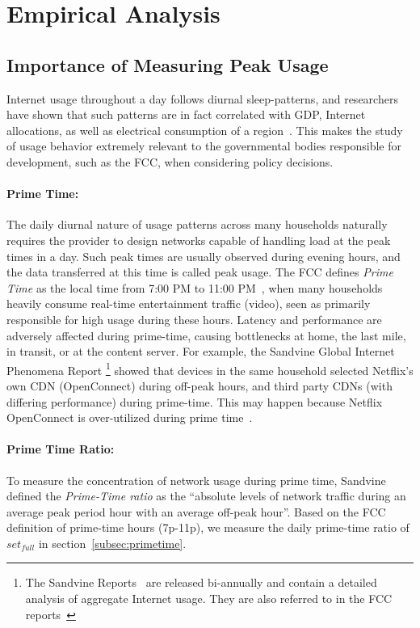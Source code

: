 \section{Empirical Analysis}\label{sec:analysis}

\subsection{Importance of Measuring Peak Usage}

Internet usage throughout a day follows diurnal sleep-patterns, and researchers
have shown that such patterns are in fact correlated with GDP, Internet allocations,
as well as electrical consumption of a region~\cite{ant-diurnal-web}. This makes
the study of usage behavior extremely relevant to the governmental bodies responsible
for development, such as the FCC, when considering policy decisions. 

\paragraph{Prime Time: }The daily diurnal nature of usage patterns across many
households naturally requires the provider to design networks capable of handling 
load at the peak times in a day. Such peak times are usually observed during
evening hours, and the data transferred at this time is called peak usage.
The FCC defines \emph{Prime Time} as the local time from 7:00 PM to 11:00
PM~\cite{fcc2014measuring-broadband}, when many
households heavily consume real-time entertainment traffic (video), seen as primarily
responsible for high usage during these hours. Latency and performance are adversely
affected during prime-time, causing bottlenecks at home, the last mile, in
transit, or at the content server. For example, the Sandvine Global
Internet Phenomena Report \footnote{The Sandvine Reports ~\cite{sandvine20141h,
sandvine20142h}are released bi-annually and
contain a detailed analysis of aggregate Internet usage. They are also referred
to in the FCC reports~\cite{fcc2015progress-report, fcc2014measuring-broadband,
fcc2014progress-report}} showed that devices in the same household selected Netflix's
own CDN (OpenConnect) during off-peak hours, and third party CDNs (with differing
performance) during prime-time. This may happen because Netflix OpenConnect is over-utilized
during prime time~\cite{sandvine20141h}.

\paragraph{Prime Time Ratio: }To measure the concentration of network usage during prime time,
Sandvine defined the \emph{Prime-Time ratio} as the ``absolute levels of network traffic
during an average peak period hour with an average off-peak hour''. Based on the FCC
definition of prime-time hours (7p-11p), we measure the daily prime-time ratio of $set_{full}$
in section~\ref{subsec:primetime}.

